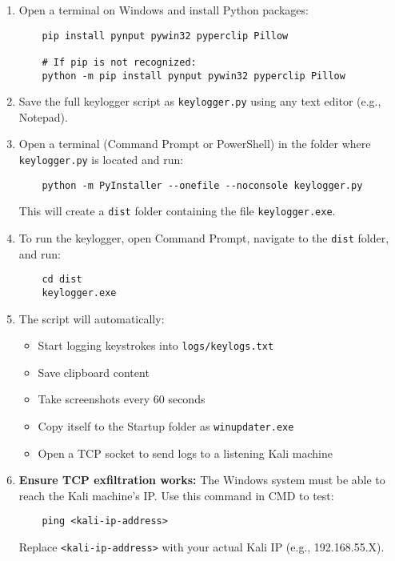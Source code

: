 \begin{enumerate}
    \item Open a terminal on Windows and install Python packages:
    \begin{verbatim}
    pip install pynput pywin32 pyperclip Pillow

    # If pip is not recognized:
    python -m pip install pynput pywin32 pyperclip Pillow
    \end{verbatim}

    \item Save the full keylogger script as \texttt{keylogger.py} using any text editor (e.g., Notepad).

    \item Open a terminal (Command Prompt or PowerShell) in the folder where \texttt{keylogger.py} is located and run:
    \begin{verbatim}
    python -m PyInstaller --onefile --noconsole keylogger.py
    \end{verbatim}
    This will create a \texttt{dist} folder containing the file \texttt{keylogger.exe}.

    \item To run the keylogger, open Command Prompt, navigate to the \texttt{dist} folder, and run:
    \begin{verbatim}
    cd dist
    keylogger.exe
    \end{verbatim}

    \item The script will automatically:
    \begin{itemize}
        \item Start logging keystrokes into \texttt{logs/keylogs.txt}
        \item Save clipboard content
        \item Take screenshots every 60 seconds
        \item Copy itself to the Startup folder as \texttt{winupdater.exe}
        \item Open a TCP socket to send logs to a listening Kali machine
    \end{itemize}

    \item \textbf{Ensure TCP exfiltration works:}
    The Windows system must be able to reach the Kali machine's IP. Use this command in CMD to test:
    \begin{verbatim}
    ping <kali-ip-address>
    \end{verbatim}
    Replace \texttt{<kali-ip-address>} with your actual Kali IP (e.g., 192.168.55.X).


\end{enumerate}
